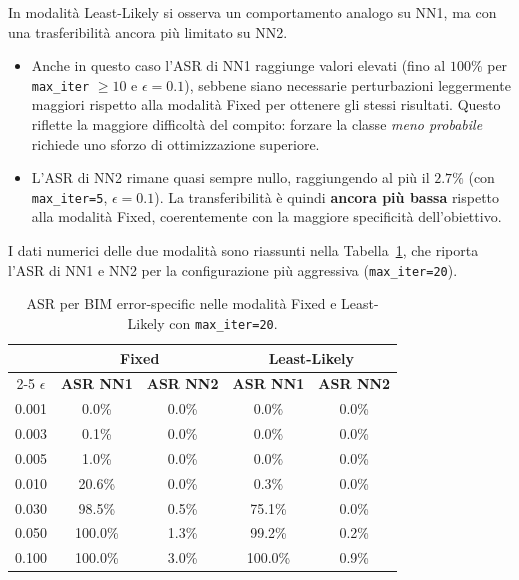 \documentclass[a4paper, 12pt]{article}
\begin{document}
In modalità Least-Likely si osserva un comportamento analogo su NN1, ma con una trasferibilità ancora più limitato su NN2.
\begin{itemize}
    \item Anche in questo caso l'ASR di NN1 raggiunge valori elevati 
    (fino al $100\%$ per \texttt{max\_iter} $\geq 10$ e $\epsilon = 0.1$), 
    sebbene siano necessarie perturbazioni leggermente maggiori rispetto alla 
    modalità Fixed per ottenere gli stessi risultati. Questo riflette la maggiore 
    difficoltà del compito: forzare la classe \textit{meno probabile} richiede uno 
    sforzo di ottimizzazione superiore.

    \item L'ASR di NN2 rimane quasi sempre nullo, raggiungendo al più il $2.7\%$ 
    (con \texttt{max\_iter=5}, $\epsilon = 0.1$). La transferibilità è quindi 
    \textbf{ancora più bassa} rispetto alla modalità Fixed, coerentemente con la 
    maggiore specificità dell'obiettivo.
\end{itemize}

I dati numerici delle due modalità sono riassunti nella 
Tabella~\ref{tab:bim_es_transferability}, che riporta l'ASR di NN1 e NN2 per la 
configurazione più aggressiva (\texttt{max\_iter=20}).

\begin{table}[H]
    \centering
    \vspace{0.2cm}
    \small
    \setlength{\tabcolsep}{8pt}
    \renewcommand{\arraystretch}{1.2}
    \begin{tabular}{| c | cc | cc |}
        \hline
        & \multicolumn{2}{c|}{\textbf{Fixed}}
        & \multicolumn{2}{c|}{\textbf{Least-Likely}} \\
        \cline{2-5} 
        \textbf{$\epsilon$}
        & \textbf{ASR NN1} & \textbf{ASR NN2}
        & \textbf{ASR NN1} & \textbf{ASR NN2} \\
        \hline
        0.001 &   0.0\% & 0.0\% &   0.0\% & 0.0\% \\
        0.003 &   0.1\% & 0.0\% &   0.0\% & 0.0\% \\
        0.005 &   1.0\% & 0.0\% &   0.0\% & 0.0\% \\
        0.010 &  20.6\% & 0.0\% &   0.3\% & 0.0\% \\
        0.030 &  98.5\% & 0.5\% &  75.1\% & 0.0\% \\
        0.050 & 100.0\% & 1.3\% &  99.2\% & 0.2\% \\
        0.100 & 100.0\% & 3.0\% & 100.0\% & 0.9\% \\
        \hline
    \end{tabular}
    \caption{ASR per BIM error-specific nelle modalità Fixed e Least-Likely con \texttt{max\_iter=20}.}
    \label{tab:bim_es_transferability}
\end{table}
\end{document}

